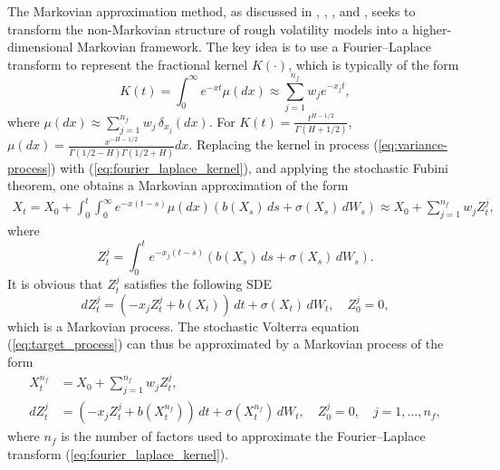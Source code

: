 \documentclass[11pt]{article}%
\theoremstyle{definition}
\begin{document}
The Markovian approximation method, as discussed in \cite{abijaberLifting2019}, \cite{ABIJABERandELEUCH2019}, \cite{AlfonsiKeabier2023}, and \cite{Bayer_Breneis_2023}, seeks to transform the non-Markovian structure of rough volatility models into a higher-dimensional Markovian framework. The key idea is to use a Fourier--Laplace transform to represent the fractional kernel $K(\cdot)$, which is typically of the form
\begin{equation}
K(t) = \int_{0}^{\infty} e^{-x t} \mu(dx) \approx \sum_{j=1}^{n_f}  w_j e^{-x_j t},\label{eq:fourier_laplace_kernel}
\end{equation}
where \(\mu(dx) \approx \sum_{j=1}^{n_f} w_j\,\delta_{x_{j}}(dx)\). For \(K(t) = \tfrac{t^{H-1/2}}{\Gamma(H+1/2)}\), \(\mu(dx) = \tfrac{x^{-H-1/2}}{\Gamma(1/2-H)\Gamma(1/2+H)}dx\). Replacing the kernel in process (\ref{eq:variance-process}) with (\ref{eq:fourier_laplace_kernel}), and applying the stochastic Fubini theorem, one obtains a Markovian approximation of the form
\begin{align}
    X_t = X_0 + \int_{0}^{t} \int_{0}^{\infty} e^{-x(t-s)} \mu(dx) \left(b(X_s)\,ds +\sigma(X_s)\,dW_s\right) \approx X_0 + \sum_{j=1}^{n_f} w_j Z_t^j,\label{eq:markovian_approximation_X_1}
\end{align}
where \[
    Z_t^j = \int_{0}^{t} e^{-x_j(t-s)} \left(b(X_s)\,ds + \sigma(X_s)\,dW_s\right).
\]
It is obvious that \(Z_t^j\) satisfies the following SDE
\begin{equation}
    dZ_t^j = (-x_j Z_t^j + b(X_t))\,dt + \sigma(X_t)\,dW_t,\quad Z_0^j = 0,\label{eq:markovian_approximation_Z_1}
\end{equation}
which is a Markovian process. The stochastic Volterra equation (\ref{eq:target_process}) can thus be approximated by a Markovian process of the form
\begin{align}
    X_t^{n_f} &= X_0 + \sum_{j=1}^{n_f} w_j Z_t^j,\label{eq:markovian_approximation_X}\\
    dZ_t^j &= (-x_j Z_t^j + b(X_t^{n_f}))\,dt + \sigma(X_t^{n_f})\,dW_t,\quad Z_0^j = 0,\quad j=1,...,n_f,\label{eq:markovian_approximation_Z}
\end{align}
where \(n_f\) is the number of factors used to approximate the Fourier--Laplace transform (\ref{eq:fourier_laplace_kernel}).
\end{document}
